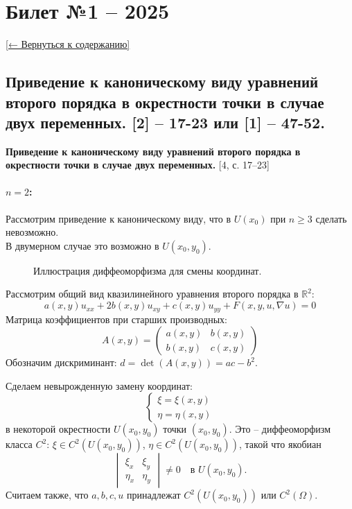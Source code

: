 \documentclass[12pt, a4paper]{article}
\newcommand{\backtotoc}{\small\hyperref[toc]{[← Вернуться к содержанию]}}
\begin{document}
\newpage

\section*{Билет №1 -- 2025}\label{sec:ticket1}
\backtotoc
\subsection*{Приведение к каноническому виду уравнений второго порядка в окрестности точки в случае
двух переменных. [2] -- 17-23 или [1] -- 47-52.}
\noindent\textbf{Приведение к каноническому виду уравнений второго порядка в окрестности точки в случае двух переменных.} [4, с. 17--23]

\paragraph{$n=2$:}
Рассмотрим приведение к каноническому виду, что в $U(x_0)$ при $n \ge 3$ сделать невозможно. \\
В двумерном случае это возможно в $U(x_0, y_0)$.

\begin{figure}[h!]
\centering
\caption{Иллюстрация диффеоморфизма для смены координат.}
\label{fig:diffeomorphism}
\end{figure}

Рассмотрим общий вид квазилинейного уравнения второго порядка в $\mathbb{R}^2$:
\begin{equation} \label{eq:quasilinear}
a(x,y) u_{xx} + 2b(x,y) u_{xy} + c(x,y) u_{yy} + F(x, y, u, \nabla u) = 0 \tag{$*$}
\end{equation}
Матрица коэффициентов при старших производных:
\[
A(x,y) = \begin{pmatrix} a(x,y) & b(x,y) \\ b(x,y) & c(x,y) \end{pmatrix}
\]
Обозначим дискриминант: $d = \det(A(x,y)) = ac - b^2$.

Сделаем невырожденную замену координат:
\[
\begin{cases}
\xi = \xi(x,y) \\
\eta = \eta(x,y)
\end{cases}
\]
в некоторой окрестности $U(x_0, y_0)$ точки $(x_0, y_0)$.
Это -- диффеоморфизм класса $C^2$: $\xi \in C^2(U(x_0, y_0))$, $\eta \in C^2(U(x_0, y_0))$, такой что якобиан
\[
\begin{vmatrix} \xi_x & \xi_y \\ \eta_x & \eta_y \end{vmatrix} \neq 0 \quad \text{в } U(x_0, y_0).
\]
Считаем также, что $a, b, c, u$ принадлежат $C^2(U(x_0, y_0))$ или $C^2(\Omega)$.
\end{document}
